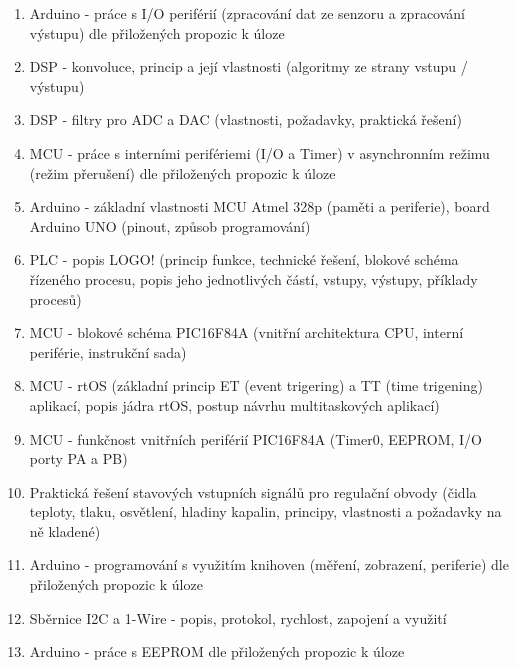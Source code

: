 \documentclass[a4paper,11pt]{article}
\begin{document}
\begin{enumerate}
            \item Arduino - práce s I/O periférií (zpracování dat ze senzoru a zpracování výstupu) dle přiložených propozic k úloze
            \item DSP - konvoluce, princip a její vlastnosti (algoritmy ze strany vstupu / výstupu)
            \item DSP - filtry pro ADC a DAC (vlastnosti, požadavky, praktická řešení)
            \item MCU - práce s interními perifériemi (I/O a Timer) v asynchronním režimu (režim přerušení) dle přiložených propozic k úloze
            \item Arduino - základní vlastnosti MCU Atmel 328p (paměti a periferie), board Arduino UNO (pinout, způsob programování)
            \item PLC - popis LOGO! (princip funkce, technické řešení, blokové schéma řízeného procesu, popis jeho jednotlivých částí, vstupy, výstupy, příklady procesů)
            \item MCU - blokové schéma PIC16F84A (vnitřní architektura CPU, interní periférie, instrukční sada)
            \item MCU - rtOS (základní princip ET (event trigering) a TT (time trigening) aplikací, popis jádra rtOS, postup návrhu multitaskových aplikací)
            \item MCU - funkčnost vnitřních periférií PIC16F84A (Timer0, EEPROM, I/O porty PA a PB)
            \item Praktická řešení stavových vstupních signálů pro regulační obvody (čidla teploty, tlaku, osvětlení, hladiny kapalin, principy, vlastnosti a požadavky na ně kladené)
            \item Arduino - programování s využitím knihoven (měření, zobrazení, periferie) dle přiložených propozic k úloze
            \item Sběrnice I2C a 1-Wire - popis, protokol, rychlost, zapojení a využití
            \item Arduino - práce s EEPROM dle přiložených propozic k úloze
        \end{enumerate}

\end{document}
